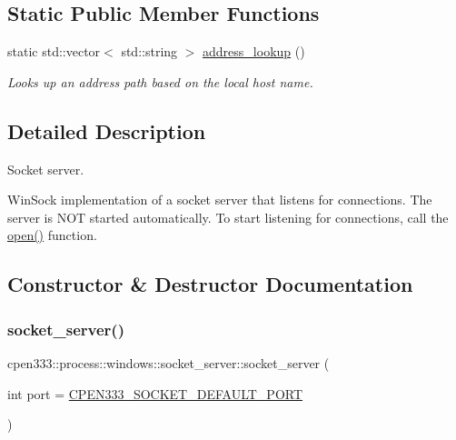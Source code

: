\subsection*{Static Public Member Functions}
\begin{DoxyCompactItemize}
\item 
static std\+::vector$<$ std\+::string $>$ \hyperlink{classcpen333_1_1process_1_1windows_1_1socket__server_ad4f6bbc14fc0f8716feea2a120873b50}{address\+\_\+lookup} ()
\begin{DoxyCompactList}\small\item\em Looks up an address path based on the local host name. \end{DoxyCompactList}\end{DoxyCompactItemize}


\subsection{Detailed Description}
Socket server. 

Win\+Sock implementation of a socket server that listens for connections. The server is N\+OT started automatically. To start listening for connections, call the \hyperlink{classcpen333_1_1process_1_1windows_1_1socket__server_a440013d371c8c49edcf0e845545d3c1d}{open()} function. 

\subsection{Constructor \& Destructor Documentation}
\mbox{\label{classcpen333_1_1process_1_1windows_1_1socket__server_a99931d4663b36d1205c6497b995203bc}} 
\subsubsection{\texorpdfstring{socket\+\_\+server()}{socket\_server()}}
{\footnotesize\ttfamily cpen333\+::process\+::windows\+::socket\+\_\+server\+::socket\+\_\+server (\begin{DoxyParamCaption}\item[{int}]{port = {\ttfamily \hyperlink{impl_2windows_2socket_8h_a5164d95d122c5161aceda0d59b962e2e}{C\+P\+E\+N333\+\_\+\+S\+O\+C\+K\+E\+T\+\_\+\+D\+E\+F\+A\+U\+L\+T\+\_\+\+P\+O\+RT}} }\end{DoxyParamCaption})\hspace{0.3cm}{\ttfamily [inline]}}



